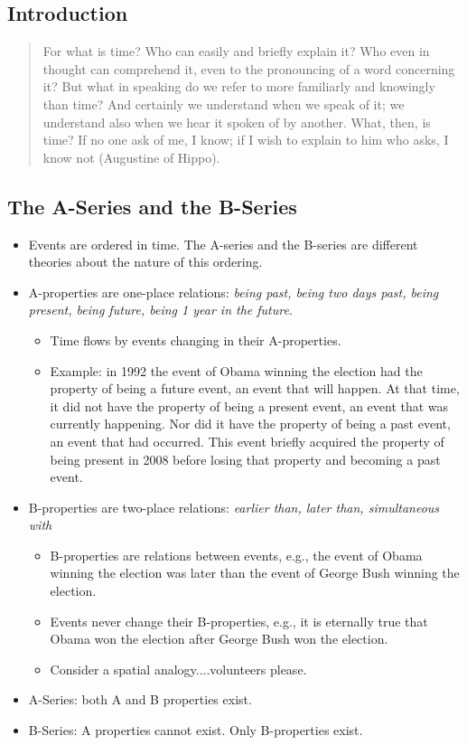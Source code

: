 \documentclass[oneside]{article}
\begin{document}
\thispagestyle{fancy}

\subsection*{Introduction}

\begin{quote}
For what is time? Who can easily and briefly explain it? Who even in thought can comprehend it, even to the pronouncing of a word concerning it? But what in speaking do we refer to more familiarly and knowingly than time? And certainly we understand when we speak of it; we understand also when we hear it spoken of by another. What, then, is time? If no one ask of me, I know; if I wish to explain to him who asks, I know not (Augustine of Hippo). 
\end{quote}


\subsection*{The A-Series and the B-Series}

\begin{itemize}
\item Events are ordered in time. The A-series and the B-series are different theories about the nature of this ordering. 
\item A-properties are one-place relations: \emph{being past, being two days past, being present, being future, being 1 year in the future}.
\begin{itemize}
\item Time flows by events changing in their A-properties. 
\item Example: in 1992 the event of Obama winning the election had the property of being a future event, an event that will happen. At that time, it did not have the property of being a present event, an event that was currently happening. Nor did it have the property of being a past event, an event that had occurred. This event briefly acquired the property of being present in 2008 before losing that property and becoming a past event. 
\end{itemize}
\item B-properties are two-place relations: \emph{earlier than, later than, simultaneous with}
\begin{itemize}
\item B-properties are relations between events, e.g., the event of Obama winning the election was later than the event of George Bush winning the election.
\item Events never change their B-properties, e.g., it is eternally true that Obama won the election after George Bush won the election.
\item Consider a spatial analogy....volunteers please.
\end{itemize}
\item A-Series: both A and B properties exist. 
\item B-Series: A properties cannot exist. Only B-properties exist. 
\end{itemize}
\end{document}
